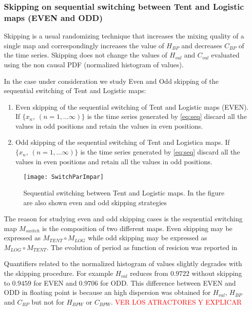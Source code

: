 \subsubsection{Skipping on sequential switching between Tent and Logistic maps (EVEN and ODD)} \label{sssec:skipp}

Skipping is a usual randomizing technique that increases the mixing quality of a single map and correspondingly increases the value of $H_{BP}$ and decreases $C_{BP} $ of the time series.
Skipping does not change the values of $H_{val}$ and $C_{val}$ evaluated using the non causal PDF (normalized histogram of values)\cite{DeMicco2008}.

In the case under consideration we study Even and Odd skipping of the sequential switching of Tent and Logistic maps:
\begin{enumerate}
	\item Even skipping of the sequential switching of Tent and Logistic maps (EVEN).\\
	If $\{x_n,~(n=1,...\infty)\}$ is the time series generated by \ref{eq:seq} discard all the values in odd positions and retain the values in even positions.
	\item Odd skipping of the sequential switching of Tent and Logistica maps.
	If $\{x_n,~(n=1,...\infty)\}$ is the time series generated by \ref{eq:seq} discard all the values in even positions and retain all the values in odd positions.
\end{enumerate}

\begin{figure}
	\texttt{[image: SwitchParImpar]}
	\caption{Sequential switching between Tent and Logistic maps. In the figure are also shown even and odd skipping strategies} \label{fig:seq}
\end{figure}

The reason for studying even and odd skipping cases is the sequential switching map $M_{switch}$ is the composition of two different maps. Even skipping may be expressed as $M_{TENT}\circ M_{LOG}$ while odd skipping may be expressed as $M_{LOG} \circ M_{TENT}$.
The evolution of period as function of resicion was reported in \

Quantifiers related to the normalized histogram of values slightly degrades with the skipping procedure. For example $H_{val}$ reduces from $0.9722$ without skipping to $0.9459$ for EVEN and $0.9706$ for ODD. 
This difference between EVEN and ODD in floating point is because an high dispersion was obtained for $H_{val}$, $H_{BP}$ and $C_{BP}$ but not for $H_{BPW}$ or $C_{BPW}$.
\textcolor{red}{VER LOS ATRACTORES Y EXPLICAR}

